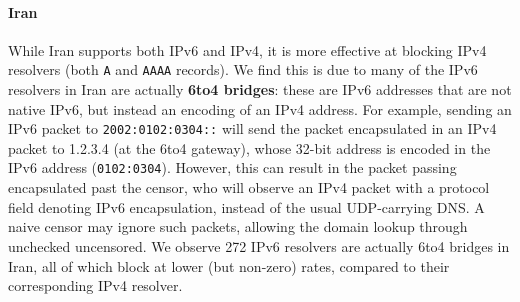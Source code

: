 






\paragraph{Iran}
While Iran supports both IPv6 and IPv4, it is more effective at blocking IPv4
resolvers (both \texttt{A} and \texttt{AAAA} records). We find this is due to
many of the IPv6 resolvers in Iran are actually \textbf{6to4 bridges}: these
are IPv6 addresses that are not native IPv6, but instead an encoding of an IPv4
address. For example, sending an IPv6 packet to \texttt{2002:0102:0304::} will
send the packet encapsulated in an IPv4 packet to 1.2.3.4 (at the 6to4 gateway),
whose 32-bit address is encoded in the IPv6 address (\texttt{0102:0304}).
However, this can result in the packet passing encapsulated past the censor, who
will observe an IPv4 packet with a protocol field denoting IPv6 encapsulation,
instead of the usual UDP-carrying DNS. A naive censor may ignore such packets,
allowing the domain lookup through unchecked uncensored. We observe 272 IPv6
resolvers are actually 6to4 bridges in Iran, all of which block at lower
(but non-zero) rates, compared to their corresponding IPv4 resolver.

%



